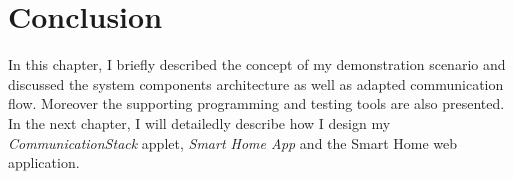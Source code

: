 \section{Conclusion}
In this chapter, I briefly described the concept of my demonstration scenario and discussed the system components architecture as well as adapted communication flow. Moreover the supporting programming and testing tools are also presented. In the next chapter, I will detailedly describe how I design my \emph{CommunicationStack} applet, \emph{Smart Home App} and the Smart Home web application.
